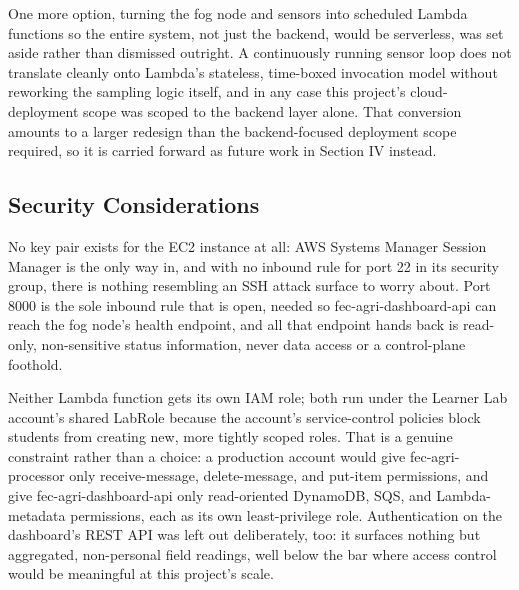 \documentclass[conference]{IEEEtran}
\begin{document}
One more option, turning the fog node and sensors into scheduled Lambda functions so the entire system, not just the backend, would be serverless, was set aside rather than dismissed outright. A continuously running sensor loop does not translate cleanly onto Lambda's stateless, time-boxed invocation model without reworking the sampling logic itself, and in any case this project's cloud-deployment scope was scoped to the backend layer alone. That conversion amounts to a larger redesign than the backend-focused deployment scope required, so it is carried forward as future work in Section IV instead.

\subsection{Security Considerations}
No key pair exists for the EC2 instance at all: AWS Systems Manager Session Manager is the only way in, and with no inbound rule for port 22 in its security group, there is nothing resembling an SSH attack surface to worry about. Port 8000 is the sole inbound rule that is open, needed so fec-agri-dashboard-api can reach the fog node's health endpoint, and all that endpoint hands back is read-only, non-sensitive status information, never data access or a control-plane foothold.

Neither Lambda function gets its own IAM role; both run under the Learner Lab account's shared LabRole because the account's service-control policies block students from creating new, more tightly scoped roles. That is a genuine constraint rather than a choice: a production account would give fec-agri-processor only receive-message, delete-message, and put-item permissions, and give fec-agri-dashboard-api only read-oriented DynamoDB, SQS, and Lambda-metadata permissions, each as its own least-privilege role. Authentication on the dashboard's REST API was left out deliberately, too: it surfaces nothing but aggregated, non-personal field readings, well below the bar where access control would be meaningful at this project's scale.
\end{document}
